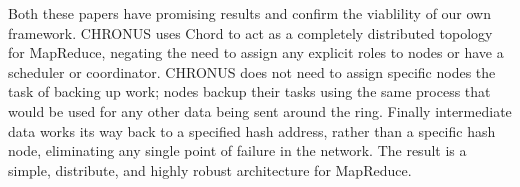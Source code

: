 \documentclass[conference, compsocconf, letterpaper]{IEEEtran}
\begin{document}
Both these papers have promising results and confirm the viablility of our own framework.  CHRONUS uses Chord to act as a completely distributed topology for MapReduce, negating the need to assign any explicit roles to nodes or have a scheduler or coordinator.  CHRONUS does not need to assign specific nodes the task of backing up work; nodes backup their tasks using the same process that would be used for any other data being sent around the ring.  Finally intermediate data works its way back to a specified hash address, rather than a specific hash node, eliminating any single point of failure in the network.  The result is a simple, distribute, and highly robust architecture for MapReduce.
  






\end{document}
